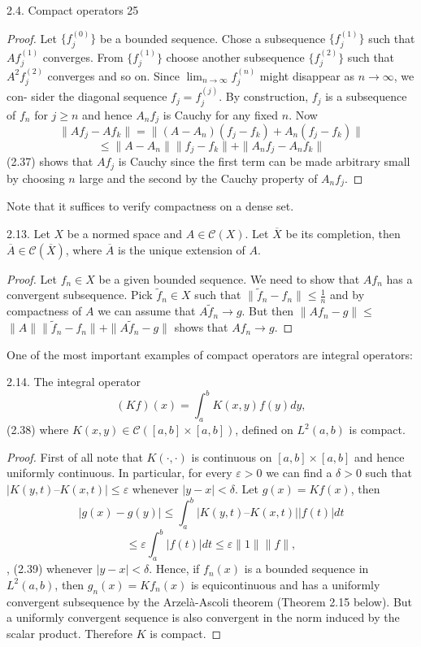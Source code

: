 2.4. Compact operators 25
\begin{proof}
Let $\{f_j^{(0)}\}$ be a bounded sequence. Chose a subsequence $\{f_j^{(1)}\}$ such
that $A f_j^{(1)}$ converges. From $\{f_j^{(1)}\}$ choose another subsequence $\{f_j^{(2)}\}$ such that
$A^2 f_j^{(2)}$ converges and so on. Since $\lim_{n \to \infty} f_j^{(n)}$ might disappear as $n \to \infty$, we con-
sider the diagonal sequence $f_j = f_j^{(j)}$. By construction, $f_j$ is a subsequence
of $f_n$ for $j \ge n$ and hence $A_n f_j$ is Cauchy for any fixed $n$. Now
$$\|A f_j - A f_k\| = \|(A - A_n)(f_j - f_k) + A_n(f_j - f_k)\|$$
$$\leq \|A - A_n\|\| f_j - f_k\| + \|A_n f_j - A_n f_k\|$$
(2.37)
shows that $A f_j$ is Cauchy since the first term can be made arbitrary small
by choosing $n$ large and the second by the Cauchy property of $A_n f_j$.
\end{proof}
Note that it suffices to verify compactness on a dense set.
\begin{theorem}{2.13.}
Let $X$ be a normed space and $A \in \mathcal{C}(X)$. Let $\overline{X}$ be its
completion, then $\overline{A} \in \mathcal{C}(\overline{X})$, where $\overline{A}$ is the unique extension of $A$.
\end{theorem}
\begin{proof}
Let $f_n \in X$ be a given bounded sequence. We need to show that
$A f_n$ has a convergent subsequence. Pick $\tilde{f}_n \in X$ such that $\|\tilde{f}_n - f_n\| \leq \frac{1}{n}$ and
by compactness of $A$ we can assume that $A\tilde{f}_n \to g$. But then $\|A f_n - g\| \leq$
$\|A\|\|\tilde{f}_n - f_n\| + \|A\tilde{f}_n - g\|$ shows that $A f_n \to g$.
\end{proof}
One of the most important examples of compact operators are integral
operators:
\begin{lemma}{2.14.}
The integral operator
$$(Kf)(x) = \int_a^b K(x,y)f(y)dy,$$
(2.38)
where $K(x, y) \in \mathcal{C}([a, b] \times [a, b])$, defined on $L^2(a,b)$ is compact.
\end{lemma}
\begin{proof}
First of all note that $K(\cdot, \cdot)$ is continuous on $[a, b] \times [a, b]$ and hence
uniformly continuous. In particular, for every $\varepsilon > 0$ we can find a $\delta > 0$
such that $|K(y,t) – K(x,t)| \leq \varepsilon$ whenever $|y - x| < \delta$. Let $g(x) = K f(x)$,
then
$$|g(x) - g(y)| \leq \int_a^b |K(y,t) – K(x,t)||f(t)|dt$$
$$\leq \varepsilon \int_a^b |f(t)|dt \leq \varepsilon \|1\| \|f\|,$$,
(2.39)
whenever $|y - x| < \delta$. Hence, if $f_n(x)$ is a bounded sequence in $L^2(a,b)$,
then $g_n(x) = K f_n(x)$ is equicontinuous and has a uniformly convergent
subsequence by the Arzelà-Ascoli theorem (Theorem 2.15 below). But a
uniformly convergent sequence is also convergent in the norm induced by
the scalar product. Therefore $K$ is compact.
\end{proof}
